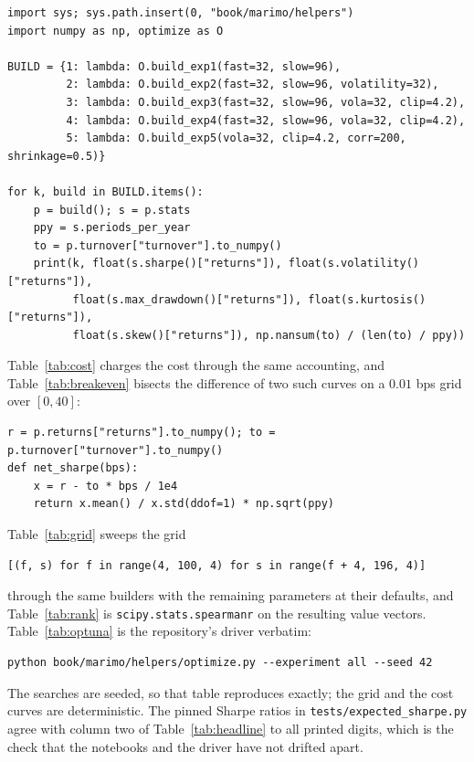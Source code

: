 \documentclass[11pt,a4paper]{article}
\newcommand{\code}[1]{\texttt{#1}}
\begin{document}
\begin{verbatim}
import sys; sys.path.insert(0, "book/marimo/helpers")
import numpy as np, optimize as O

BUILD = {1: lambda: O.build_exp1(fast=32, slow=96),
         2: lambda: O.build_exp2(fast=32, slow=96, volatility=32),
         3: lambda: O.build_exp3(fast=32, slow=96, vola=32, clip=4.2),
         4: lambda: O.build_exp4(fast=32, slow=96, vola=32, clip=4.2),
         5: lambda: O.build_exp5(vola=32, clip=4.2, corr=200, shrinkage=0.5)}

for k, build in BUILD.items():
    p = build(); s = p.stats
    ppy = s.periods_per_year
    to = p.turnover["turnover"].to_numpy()
    print(k, float(s.sharpe()["returns"]), float(s.volatility()["returns"]),
          float(s.max_drawdown()["returns"]), float(s.kurtosis()["returns"]),
          float(s.skew()["returns"]), np.nansum(to) / (len(to) / ppy))
\end{verbatim}

Table~\ref{tab:cost} charges the cost through the same accounting, and
Table~\ref{tab:breakeven} bisects the difference of two such curves on a
$0.01$ bps grid over $[0, 40]$:

\begin{verbatim}
r = p.returns["returns"].to_numpy(); to = p.turnover["turnover"].to_numpy()
def net_sharpe(bps):
    x = r - to * bps / 1e4
    return x.mean() / x.std(ddof=1) * np.sqrt(ppy)
\end{verbatim}

Table~\ref{tab:grid} sweeps the grid

\begin{verbatim}
[(f, s) for f in range(4, 100, 4) for s in range(f + 4, 196, 4)]
\end{verbatim}

through the same builders with the remaining parameters at their defaults, and
Table~\ref{tab:rank} is \code{scipy.stats.spearmanr} on the resulting value
vectors. Table~\ref{tab:optuna} is the repository's driver verbatim:

\begin{verbatim}
python book/marimo/helpers/optimize.py --experiment all --seed 42
\end{verbatim}

The searches are seeded, so that table reproduces exactly; the grid and the
cost curves are deterministic. The pinned Sharpe ratios in
\code{tests/expected\_sharpe.py} agree with column two of
Table~\ref{tab:headline} to all printed digits, which is the check that the
notebooks and the driver have not drifted apart.



\end{document}
